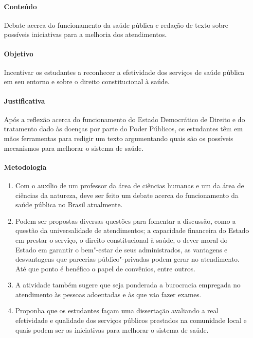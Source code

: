 \documentclass[12pt]{extarticle}
\begin{document}
\paragraph{Conteúdo} Debate acerca do funcionamento da saúde pública
e redação de texto sobre possíveis iniciativas para a melhoria dos atendimentos.

\paragraph{Objetivo} Incentivar os estudantes a reconhecer a efetividade
dos serviços de saúde pública em seu entorno e sobre o direito
constitucional à saúde.

\paragraph{Justificativa} Após a reflexão acerca do 
funcionamento do Estado Democrático de Direito
e do tratamento dado às doenças por parte do Poder Públicos, os estudantes 
têm em mãos ferramentas para redigir um texto argumentando quais são os 
possíveis mecanismos para melhorar o sistema de saúde.

\paragraph{Metodologia}

\begin{enumerate} 

\item Com o auxílio de um professor da área de ciências 
humanas e um da área de ciências da natureza, deve ser feito um debate
acerca do funcionamento da saúde pública no Brasil atualmente.

\item Podem ser propostas diversas questões para fomentar a discussão, como a
questão da universalidade de atendimentos; a capacidade financeira do
Estado em prestar o serviço, o direito constitucional à saúde, o dever
moral do Estado em garantir o bem"-estar de seus administrados, as
vantagens e desvantagens que parcerias público"-privadas podem gerar no
atendimento. Até que ponto é benéfico o papel de convênios, entre
outros.

\item A atividade também sugere que seja ponderada a burocracia
empregada no atendimento às pessoas adoentadas e às que vão
fazer exames.

\item Proponha que os estudantes façam uma dissertação
avaliando a real efetividade e qualidade dos serviços públicos prestados
na comunidade local e quais podem ser as 
iniciativas para melhorar o sistema de saúde.

\end{enumerate}
\end{document}
